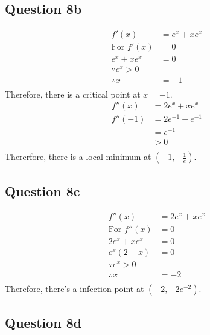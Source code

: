 \documentclass{article}
\begin{document}
\subsection*{Question 8b}
\begin{align*}
    f'(x)            & = e^x+xe^x \\
    \text{For }f'(x) & = 0        \\
    e^x+xe^x         & = 0        \\
    \because e^x > 0 &            \\
    \therefore x     & = -1       \\
\end{align*}
Therefore, there is a critical point at $x=-1$.
\begin{align*}
    f''(x)  & = 2e^x+xe^x      \\
    f''(-1) & = 2e^{-1}-e^{-1} \\
            & = e^{-1}         \\
            & > 0              \\
\end{align*}
Thererfore, there is a local minimum at $(-1, -\frac{1}{e})$.

\subsection*{Question 8c}
\begin{align*}
    f''(x)            & = 2e^x+xe^x \\
    \text{For }f''(x) & = 0         \\
    2e^x+xe^x         & = 0         \\
    e^x(2+x)          & = 0         \\
    \because e^x > 0  &             \\
    \therefore x      & = -2        \\
\end{align*}
Therefore, there's a infection point at $(-2, -2e^{-2})$.

\subsection*{Question 8d}
\end{document}
